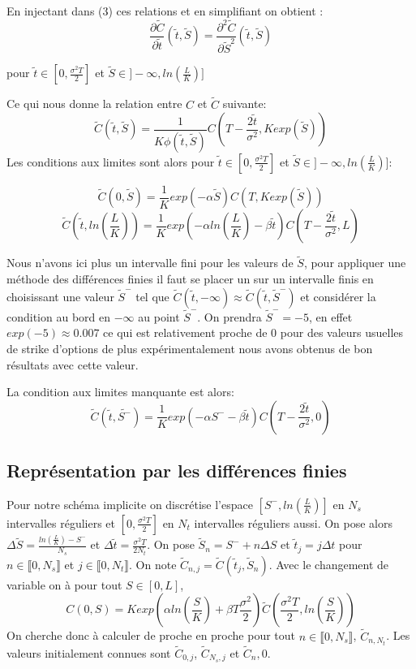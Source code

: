 \documentclass[11pt,a4paper]{article}
\begin{document}
En injectant dans (3) ces relations et en simplifiant on obtient :
\begin{equation}
\frac{\partial \tilde{C}}{\partial \tilde{t}}(\tilde{t}, \tilde{S}) = \frac{\partial^2 \tilde{C}}{\partial \tilde{S}^2}(\tilde{t}, \tilde{S})
\end{equation}

pour $\tilde{t} \in [0, \frac{\sigma^2 T}{2}]$ et $\tilde{S} \in ]-\infty , ln(\frac{L}{K})]$

Ce qui nous donne la relation entre $C$ et $\tilde{C}$ suivante:
\[\tilde{C}(\tilde{t}, \tilde{S}) = \frac{1}{K\phi(\tilde{t}, \tilde{S})}C(T - \frac{2\tilde{t}}{\sigma^2}, Kexp(\tilde{S}))\]
Les conditions aux limites sont alors pour $\tilde{t} \in [0, \frac{\sigma^2 T}{2}]$ et $\tilde{S} \in ]-\infty , ln(\frac{L}{K})]$:

\[\tilde{C}(0, \tilde{S}) = \frac{1}{K}exp(-\alpha \tilde{S})C(T,Kexp(\tilde{S}))\]
\[\tilde{C}(\tilde{t}, ln(\frac{L}{K})) = \frac{1}{K}exp(-\alpha ln(\frac{L}{K}) - \beta \tilde{t})C(T - \frac{2\tilde{t}}{\sigma^2}, L)\]

Nous n'avons ici plus un intervalle fini pour les valeurs de $\tilde{S}$, pour appliquer une méthode des différences finies il faut se placer un sur un intervalle finis en choisissant une valeur $\tilde{S}^-$ tel que $\tilde{C}(\tilde{t}, -\infty) \approx \tilde{C}(\tilde{t}, \tilde{S}^-)$ et considérer la condition au bord en $-\infty$ au point $\tilde{S}^-$.
On prendra $\tilde{S}^- = -5$, en effet $exp(-5) \approx 0.007$ ce qui est relativement proche de 0 pour des valeurs usuelles de strike d'options de plus expérimentalement nous avons obtenus de bon résultats avec cette valeur.

La condition aux limites manquante est alors:
\[\tilde{C}(\tilde{t}, \tilde{S^-}) = \frac{1}{K} exp(-\alpha S^- - \beta \tilde{t}) C(T - \frac{2\tilde{t}}{\sigma^2}, 0)\]

\subsection{Représentation par les différences finies}
Pour notre schéma implicite on discrétise l'espace $[S^-, ln(\frac{L}{K})]$ en $N_s$ intervalles réguliers et $[0, \frac{\sigma^2 T}{2}]$ en $N_t$ intervalles réguliers aussi. On pose alors $\Delta \tilde{S} = \frac{ln(\frac{L}{K}) - S^-}{N_s}$ et $\Delta \tilde{t} = \frac{\sigma^2 T}{2N_t}$. On pose $\tilde{S}_n = S^- + n\Delta	S$ et $\tilde{t}_j = j\Delta t$ pour $n \in \llbracket 0,N_s \rrbracket$ et $j \in \llbracket 0,N_t \rrbracket$.
On note $\tilde{C}_{n,j} = \tilde{C}(\tilde{t}_j, \tilde{S}_n)$. Avec le changement de variable on à pour tout $S \in [0, L]$, 
\[C(0, S) = K exp(\alpha ln(\frac{S}{K}) + \beta T\frac{\sigma^2}{2})\tilde{C}(\frac{\sigma^2 T}{2}, ln(\frac{S}{K}))\]
On cherche donc à calculer de proche en proche pour tout $n \in \llbracket 0,N_s \rrbracket$, $\tilde{C}_{n,N_t}$. Les valeurs initialement connues sont $\tilde{C}_{0,j}$, $\tilde{C}_{N_s,j}$ et $\tilde{C}_n,0$.
\end{document}
